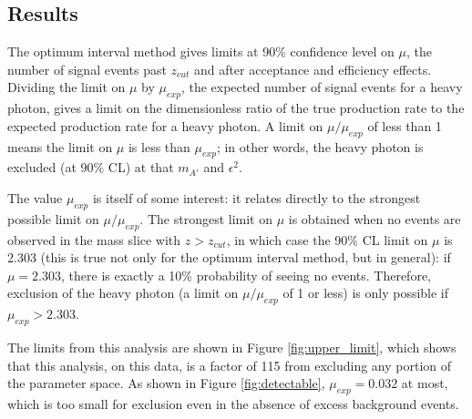\subsection{Results}
\label{sec:results}
The optimum interval method gives limits at 90\% confidence level on $\mu$, the number of signal events past $z_{cut}$ and after acceptance and efficiency effects.
Dividing the limit on $\mu$ by $\mu_{exp}$, the expected number of signal events for a heavy photon, gives a limit on the dimensionless ratio of the true production rate to the expected production rate for a heavy photon.
A limit on $\mu/\mu_{exp}$ of less than 1 means the limit on $\mu$ is less than $\mu_{exp}$; in other words, the heavy photon is excluded (at 90\% CL) at that $m_{A'}$ and $\epsilon^2$.

The value $\mu_{exp}$ is itself of some interest: it relates directly to the strongest possible limit on $\mu/\mu_{exp}$.
The strongest limit on $\mu$ is obtained when no events are observed in the mass slice with $z>z_{cut}$, in which case the 90\% CL limit on $\mu$ is 2.303 (this is true not only for the optimum interval method, but in general): if $\mu=2.303$, there is exactly a 10\% probability of seeing no events.
Therefore, exclusion of the heavy photon (a limit on $\mu/\mu_{exp}$ of 1 or less) is only possible if $\mu_{exp}>2.303$.

The limits from this analysis are shown in Figure \ref{fig:upper_limit}, which shows that this analysis, on this data, is a factor of 115 from excluding any portion of the parameter space.
As shown in Figure \ref{fig:detectable}, $\mu_{exp}=0.032$ at most, which is too small for exclusion even in the absence of excess background events.

